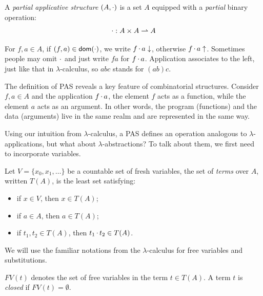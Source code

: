 \begin{definition}
   A \emph{partial applicative structure} \((A, \mathop\cdot\nolimits)\) is a set \(A\) equipped with a \emph{partial} binary operation:
   \[
        \mathop\cdot\nolimits : A \times A \rightharpoonup A
   \]

   For \(f, a \in A\), if \((f, a) \in \operatorname{\mathsf{dom}}(\mathop\cdot\nolimits)\), we write \(f \mathop\cdot\nolimits a \downarrow\), otherwise \(f \mathop\cdot\nolimits a \uparrow\).  Sometimes people may omit \(\mathop\cdot\nolimits\) and just write \(fa\) for \(f \mathop\cdot\nolimits a\).  Application associates to the left, just like that in \(\lambda\)-calculus, so \(abc\) stands for \((ab)c\).
\end{definition}

The definition of PAS reveals a key feature of combinatorial structures.  Consider \(f, a \in A\) and the application \(f \mathop\cdot\nolimits a\), the element \(f\) acts as a function, while the element \(a\) acts as an argument.  In other words, the program (functions) and the data (arguments) live in the same realm and are represented in the same way.

Using our intuition from \(\lambda\)-calculus, a PAS defines an operation analogous to \(\lambda\)-applications, but what about \(\lambda\)-abstractions?  To talk about them, we first need to incorporate variables. 

\begin{definition}
    Let \(V = \{x_{0}, x_{1}, \ldots\}\) be a countable set of fresh variables, the set of \emph{terms} over \(A\), written \(T(A)\), is the least set satisfying:
    \begin{itemize}
        \item if \(x \in V\), then \(x \in T(A)\);
        \item if \(a \in A\), then \(a \in T(A)\);
        \item if \(t_1, t_2 \in T(A)\), then \(t_1 \mathop\cdot\nolimits t_2 \in T(A)\).
    \end{itemize}
\end{definition}

We will use the familiar notations from the \(\lambda\)-calculus for free variables and substitutions.

\begin{notation}
    \(FV(t)\) denotes the set of free variables in the term \(t \in T(A)\).  A term \(t\) is \emph{closed} if \(FV(t) = \emptyset\).
\end{notation}


